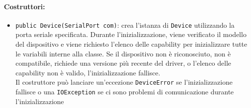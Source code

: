 \paragraph{Costruttori:}\begin{itemize}
	\item \texttt{public Device(SerialPort com)}: crea l'istanza di \texttt{Device} utilizzando la porta seriale specificata. Durante l'inizializzazione, viene verificato il modello del dispositivo e viene richiesto l'elenco delle capability per inizializzare tutte le variabili interne alla classe. Se il dispositivo non è riconosciuto, non è compatibile, richiede una versione più recente del driver, o l'elenco delle capability non è valido, l'inizializzazione fallisce.\\
	Il costruttore può lanciare un'eccezione \texttt{DeviceError} se l'inizializzazione fallisce o una \texttt{IOException} se ci sono problemi di comunicazione durante l'inizializzazione
\end{itemize}


